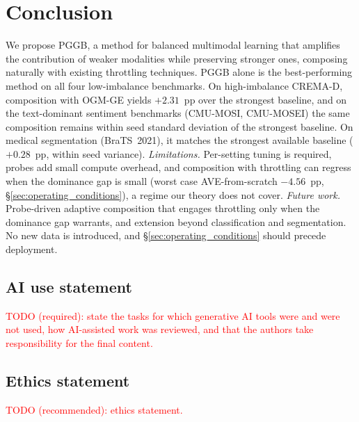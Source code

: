\documentclass{article} %
\begin{document}
\section{Conclusion}
\label{sec:conclusion}

We propose PGGB, a method for balanced multimodal learning that amplifies the contribution of weaker modalities while preserving stronger ones, composing naturally with existing throttling techniques. PGGB alone is the best-performing method on all four low-imbalance benchmarks. On high-imbalance CREMA-D, composition with OGM-GE yields $+2.31$~pp over the strongest baseline, and on the text-dominant sentiment benchmarks (CMU-MOSI, CMU-MOSEI) the same composition remains within seed standard deviation of the strongest baseline. On medical segmentation (BraTS~2021), it matches the strongest available baseline ($+0.28$~pp, within seed variance). \emph{Limitations.} Per-setting tuning is required, probes add small compute overhead, and composition with throttling can regress when the dominance gap is small (worst case AVE-from-scratch $-4.56$~pp, \S\ref{sec:operating_conditions}), a regime our theory does not cover. \emph{Future work.} Probe-driven adaptive composition that engages throttling only when the dominance gap warrants, and extension beyond classification and segmentation. No new data is introduced, and \S\ref{sec:operating_conditions} should precede deployment.


\subsection*{AI use statement}
\textcolor{red}{TODO (required): state the tasks for which generative AI tools were and were not used, how AI-assisted work was reviewed, and that the authors take responsibility for the final content.}

\subsection*{Ethics statement}
\textcolor{red}{TODO (recommended): ethics statement.}
\end{document}
